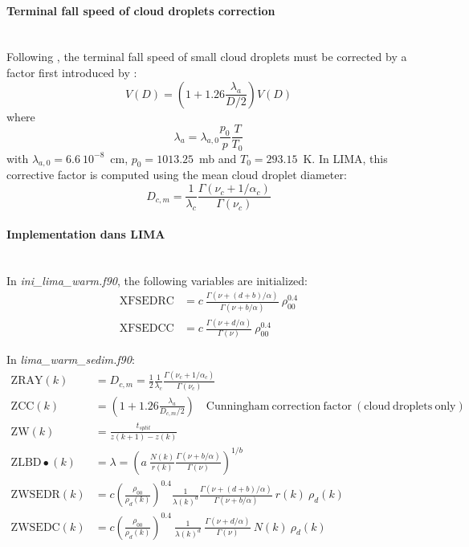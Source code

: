 \paragraph{Terminal fall speed of cloud droplets correction}
~\\
Following \citet[][Chapter 10.3.6, Eq.\ (10-139)]{Pruppacher1997}, the terminal fall speed of small cloud droplets must be corrected by a factor first introduced by \citet{Cunningham1910}:
\begin{equation}
 V(D) = (1 + 1.26 \frac{\lambda_a}{D/2}) V(D)
\end{equation}
where
\begin{equation}
 \lambda_a = \lambda_{a,0} \frac{p_0}{p} \frac{T}{T_0}
\end{equation}
with $\lambda_{a,0} = 6.6~10^{-8}$~cm, $p_0 = 1013.25$~mb and $T_0 = 293.15$~K. In LIMA, this corrective factor is computed using the mean cloud droplet diameter:
\begin{equation}
 D_{c,m} = \frac{1}{\lambda_c} \frac{\Gamma(\nu_c + 1/\alpha_c)}{\Gamma(\nu_c)}
\end{equation}

\paragraph{Implementation dans LIMA}
~\\
In \emph{ini\_lima\_warm.f90}, the following variables are initialized:
\begin{align}
 \mathrm{XFSEDRC} &= c ~ \frac{\Gamma(\nu+(d+b)/\alpha)}{\Gamma(\nu+b/\alpha)} ~ \rho_{00}^{0.4} \\
 \mathrm{XFSEDCC} &= c ~ \frac{\Gamma(\nu+d/\alpha)}{\Gamma(\nu)} ~ \rho_{00}^{0.4}
\end{align}

In \emph{lima\_warm\_sedim.f90}:
\begin{align}
 \mathrm{ZRAY}(k) &= D_{c,m} = \frac{1}{2} \frac{1}{\lambda_c} \frac{\Gamma(\nu_c + 1/\alpha_c)}{\Gamma(\nu_c)} \\
 \mathrm{ZCC}(k) &= (1 + 1.26 \frac{\lambda_a}{D_{c,m}/2}) \quad \mathrm{Cunningham~correction~factor~(cloud~droplets~only)} \\
 \mathrm{ZW}(k) &= \frac{t_{split}}{z(k+1)-z(k)} \\
 \mathrm{ZLBD\bullet}(k) &= \lambda = \left(a ~ \frac{N(k)}{r(k)} \frac{\Gamma(\nu+b/\alpha)}{\Gamma(\nu)}\right)^{1/b} \\
 \mathrm{ZWSEDR}(k) &= c \left(\frac{\rho_{00}}{\rho_d(k)}\right)^{0.4} \frac{1}{\lambda(k)^d} \frac{\Gamma(\nu+(d+b)/\alpha)}{\Gamma(\nu+b/\alpha)} ~ r(k)  ~ \rho_d(k) \\
 \mathrm{ZWSEDC}(k) &= c \left(\frac{\rho_{00}}{\rho_d(k)}\right)^{0.4} ~ \frac{1}{\lambda(k)^d}  ~ \frac{\Gamma(\nu+d/\alpha)}{\Gamma(\nu)} ~ N(k) ~ \rho_d(k)
\end{align}

